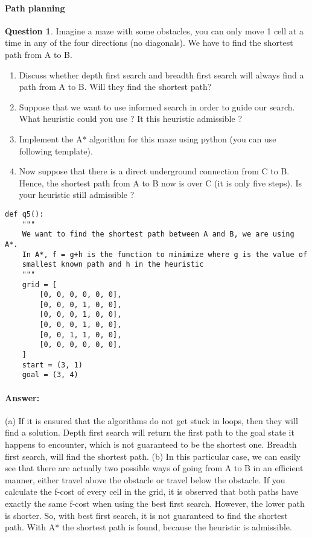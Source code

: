 \documentclass[11pt,a4paper]{article}
\theoremstyle{definition}%
\newtheorem{Q}{Question}[] %
\newcommand{\reponse}[1]{%
\ifthenelse {\boolean{corrige}} {\paragraph{Answer:} \color{darkblue}   #1\color{black}} {}
}
\begin{document}
\paragraph{Path planning}
\begin{Q}
    Imagine a maze with some obstacles, you can only move 1 cell at a time in any of 
    the four directions (no diagonals). We have to find the shortest path from A to B.
\begin{enumerate}
    \item Discuss whether depth first search and breadth first search will always find a path from
    A to B. Will they find the shortest path?
    \item Suppose that we want to use informed search in order to guide our search. 
        What heuristic could you use ? It this heuristic admissible ?
    \item Implement the A* algorithm for this maze using python (you can use following template).
    \item Now suppose that there is a direct underground connection from C to B. Hence, the
    shortest path from A to B now is over C (it is only five steps). Is your heuristic still admissible ?
\end{enumerate}

\begin{verbatim}
def q5():
    """
    We want to find the shortest path between A and B, we are using A*.
    In A*, f = g+h is the function to minimize where g is the value of
    smallest known path and h in the heuristic
    """
    grid = [
        [0, 0, 0, 0, 0, 0],
        [0, 0, 0, 1, 0, 0],
        [0, 0, 0, 1, 0, 0],
        [0, 0, 0, 1, 0, 0],
        [0, 0, 1, 1, 0, 0],
        [0, 0, 0, 0, 0, 0],
    ]
    start = (3, 1)
    goal = (3, 4)
\end{verbatim}

\reponse{
    (a) If it is ensured that the algorithms do not get stuck in loops, then they will find a
solution. Depth first search will return the first path to the goal state it happens to
encounter, which is not guaranteed to be the shortest one. Breadth first search, will
find the shortest path.
(b) In this particular case, we can easily see that there are actually two possible ways of
going from A to B in an efficient manner, either travel above the obstacle or travel
below the obstacle. If you calculate the f-cost of every cell in the grid, it is observed
that both paths have exactly the same f-cost when using the best first search. However,
the lower path is shorter. So, with best first search, it is not guaranteed to find the
shortest path. With A* the shortest path is found, because the heuristic is admissible.

}
\end{Q}
\end{document}
